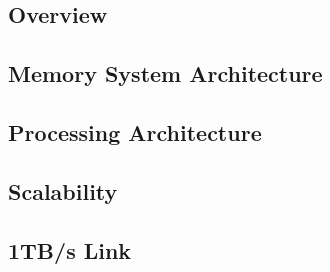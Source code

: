 

\subsection{Overview}
\label{sec:overview}


\subsection{Memory System Architecture}
\label{sec:memory}


\subsection{Processing Architecture}
\label{sec:processing}


\subsection{Scalability}
\label{sec:scale}



\subsection{1TB/s Link}
\label{sec:link}

